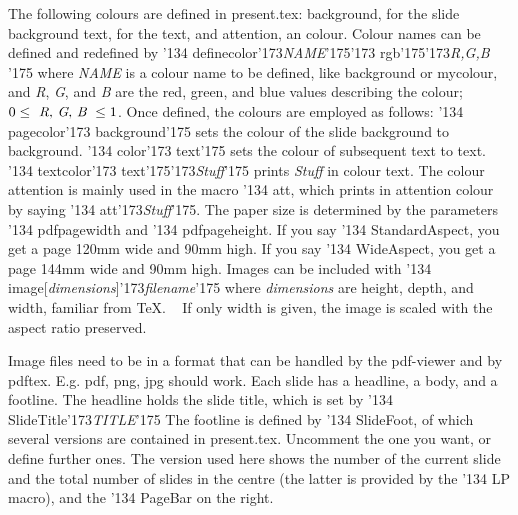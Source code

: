 The following colours are
defined in {\cf present.tex}:
\vskip5pt
{\cf background}, for the slide background 
\vskip5pt
{\cf text}, for the text, and
\vskip5pt
{\cf attention}, an  colour.
\vskip5pt
Colour names can be defined and redefined by
\vskip5pt
{\cf\char'134 definecolor\char'173}{\it NAME\/}{\cf\char'175\char'173 rgb\char'175\char'173}{\it R,G,B\/}%
{\cf\char'175}
\vskip5pt
where {\it NAME} is a colour name to be defined, like {\cf background} or {\cf mycolour}, and {\it R}, 
{\it G}, and {\it B} are
the red, green, and blue values describing the colour; $0\leq\hbox{ {\it R}, {\it G}, {\it B} }\leq 1$.
\NewSlide
Once defined, the colours are employed as follows:
\vskip3pt
{\cf\char'134 pagecolor\char'173 background\char'175} sets the colour of the slide background to {\cf background}.
\vskip3pt
{\cf\char'134 color\char'173 text\char'175} sets the colour of subsequent text to {\cf text}.
\vskip3pt
{\cf\char'134 textcolor\char'173 text\char'175\char'173}{\it Stuff\/}{\cf\char'175} prints {\it Stuff} 
in colour {\cf text}.
\vskip5pt
The colour {\cf attention} is mainly used in the macro {\cf\char'134 att}, which prints 
 in attention colour by saying
{\cf\char'134 att\char'173}{\it Stuff\/}{\cf \char'175}.
\NewSlide
The paper size is determined by the parameters {\cf\char'134 pdfpagewidth} and
{\cf\char'134 pdfpageheight}. 
\vskip10pt
If you say {\cf\char'134 StandardAspect}, you get a page 120mm wide and 90mm high.
\vskip10pt
If you say {\cf\char'134 WideAspect}, you get a page 144mm wide and 90mm high.
\NewSlide
Images can be included with
\vskip5pt
{\cf\char'134 image[}{\it dimensions}{\cf]\char'173}{\it filename}{\cf\char'175}
\vskip5pt
where {\it dimensions} are {\cf height}, {\cf depth}, and {\cf width}, familiar from \TeX.
\vskip5pt
\hbox{%
}
\vskip5pt
If only {\cf width} is given, the image is scaled with the aspect ratio preserved.

Image files need to be in a format that can be handled by the pdf-viewer and by {\cf pdftex}.
E.g. pdf, png, jpg should work.
\NewSlide
\pagecolor{background}
Each slide has a headline, a body, and a footline.
\vskip5pt
The headline holds the slide title, which is set by 
\vskip5pt
{\cf\char'134 SlideTitle\char'173}{\it TITLE\/}{\cf\char'175}
\vskip5pt
The footline is defined by 
{\cf\char'134 SlideFoot}, of which several versions are contained in {\cf present.tex}. Uncomment the one you want,
or define further ones.
\vskip5pt
The version used here shows the number of the current slide and the total number of slides in the centre (the latter is
provided by the {\cf\char'134 LP} macro), and the {\cf\char'134 PageBar} on the right.

